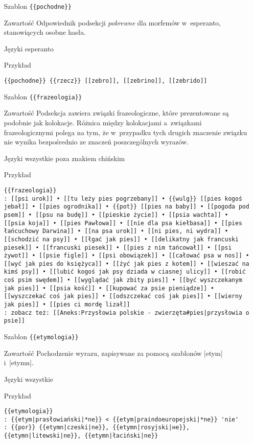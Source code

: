 \spacer
\begin{opis}
	\item[Szablon] \verb|{{pochodne}}|
	\item[Zawartość] Odpowiednik podsekcji \emph{pokrewne} dla morfemów w~esperanto, stanowiących osobne hasła.
	\item[Języki] esperanto
	\item[Przykład]
\begin{lstlisting}
{{pochodne}} {{rzecz}} [[zebro]], [[zebrino]], [[zebrido]]
\end{lstlisting}
\end{opis}
\spacer
\begin{opis}
	\item[Szablon] \verb|{{frazeologia}}|
	\item[Zawartość] Podsekcja zawiera związki frazeologiczne, które prezentowane są podobnie jak kolokacje. Różnica między kolokacjami a~związkami frazeologicznymi polega na tym, że w~przypadku tych drugich znaczenie związku nie wynika bezpośrednio ze znaczeń poszczególnych wyrazów.
	\item[Języki] wszystkie poza znakiem chińskim
	\item[Przykład]
\begin{lstlisting}
{{frazeologia}}
: [[psi urok]] • [[tu leży pies pogrzebany]] • {{wulg}} [[pies kogoś jebał]] • [[pies ogrodnika]] • {{pot}} [[pies na baby]] • [[pogoda pod psem]] • [[psu na budę]] • [[pieskie życie]] • [[psia wachta]] • [[psia koja]] • [[pies Pawłowa]] • [[nie dla psa kiełbasa]] • [[pies łańcuchowy Darwina]] • [[na psa urok]] • [[ni pies, ni wydra]] • [[schodzić na psy]] • [[łgać jak pies]] • [[delikatny jak francuski piesek]] • [[francuski piesek]] • [[pies z nim tańcował]] • [[psi żywot]] • [[psie figle]] • [[psi obowiązek]] • [[całować psa w nos]] • [[wyć jak pies do księżyca]] • [[żyć jak pies z kotem]] • [[wieszać na kimś psy]] • [[lubić kogoś jak psy dziada w ciasnej ulicy]] • [[robić coś psim swędem]] • [[wyglądać jak zbity pies]] • [[być wyszczekanym jak pies]] • [[psia kość]] • [[kupować za psie pieniądze]] • [[wyszczekać coś jak pies]] • [[odszczekać coś jak pies]] • [[wierny jak pies]] • [[pies ci mordę lizał]]
: zobacz też: [[Aneks:Przysłowia polskie - zwierzęta#pies|przysłowia o psie]]
\end{lstlisting}
\end{opis}
\spacer
\begin{opis}
	\item[Szablon] \verb|{{etymologia}}|
	\item[Zawartość] Pochodzenie wyrazu, zapisywane za pomocą szablonów \kod|{{etym}}| i~\kod|{{etymn}}|.
	\item[Języki] wszystkie
	\item[Przykład]
\begin{lstlisting}
{{etymologia}}
: {{etym|prasłowiański|*ne}} < {{etym|praindoeuropejski|*ne}} 'nie'
: {{por}} {{etymn|czeski|ne}}, {{etymn|rosyjski|не}}, {{etymn|litewski|ne}}, {{etymn|łaciński|ne}}
\end{lstlisting}
\end{opis}
